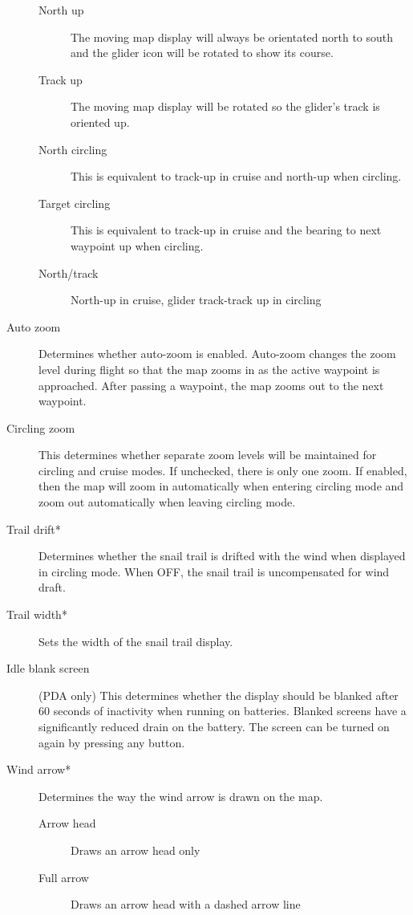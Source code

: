 \documentclass[a4paper,12pt]{refrep}
\begin{document}
\begin{description}
\begin{description}
\item[North up] The moving map display will always be orientated north to south and the glider icon will be rotated to show its course.
\item[Track up] The moving map display will be rotated so the glider's track
 is oriented up.
\item[North circling] This is equivalent to track-up in cruise and north-up when circling.
\item[Target circling] This is equivalent to track-up in cruise and the bearing to next waypoint up when circling.
\item[North/track] North-up in cruise, glider track-track up in circling
\end{description}
\item[Auto zoom] Determines whether auto-zoom is enabled.  Auto-zoom changes
the zoom level during flight so that the map zooms in as the active waypoint
is approached.  After passing a waypoint, the map zooms out to the next waypoint.  
\item[Circling zoom]  This determines whether separate zoom levels
will be maintained for circling and cruise modes.  If unchecked, there
is only one zoom.  If enabled, then the map will zoom in automatically
when entering circling mode and zoom out automatically when leaving
circling mode.
\item[Trail drift*] Determines whether the snail trail is drifted with the wind when displayed in circling mode.  When OFF, the snail trail is uncompensated for wind draft.
\item[Trail width*] Sets the width of the snail trail display.
\item[Idle blank screen] (PDA only)
This determines whether the display should be blanked after 60 seconds
of inactivity when running on batteries.  Blanked screens have a
significantly reduced drain on the battery.  The screen can be turned
on again by pressing any button.
\item[Wind arrow*]  Determines the way the wind arrow is drawn on the map.
\begin{description}
\item[Arrow head] Draws an arrow head only
\item[Full arrow] Draws an arrow head with a dashed arrow line
\end{description}
\end{description}

\end{document}
